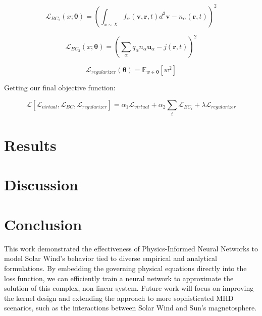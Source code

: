 \documentclass[12pt]{article}
\begin{document}
\begin{equation}
    \mathcal{L}_{BC_2} \left(x; \mathbf{\theta}\right) = \left(\int_{x \sim X} f_\alpha (\mathbf{v}, \mathbf{r}, t) d^3\mathbf{v} - n_\alpha(\mathbf{r}, t) \right)^2
\end{equation}

\begin{equation}
    \mathcal{L}_{BC_3} \left(x; \mathbf{\theta}\right) = \left(\sum_{\alpha} q_\alpha n_\alpha  \mathbf{u}_\alpha- j(\mathbf{r}, t) \right)^2
\end{equation}

\begin{equation}
    \mathcal{L}_{regularizer} \left( \mathbf{\theta} \right) = \mathbb{E}_{w \in \mathbf{\theta}}\left[ w ^ 2 \right]
\end{equation}

Getting our final objective function:

\begin{equation}
    \mathcal{L}\left[\mathcal{L}_{virtual}, \mathcal{L}_{BC}, \mathcal{L}_{regularizer}\right] = \alpha_1 \mathcal{L}_{virtual} + \alpha_2 \sum_{i} \mathcal{L}_{BC_i} + \lambda \mathcal{L}_{regularizer}
\end{equation}

\section{Results}

\section{Discussion}

\section{Conclusion}
This work demonstrated the effectiveness of Physics-Informed Neural Networks to model Solar Wind's behavior tied to diverse empirical and analytical formulations. By embedding the governing physical equations directly into the loss function, we can efficiently train a neural network to approximate the solution of this complex, non-linear system. Future work will focus on improving the kernel design and extending the approach to more sophisticated MHD scenarios, such as the interactions between Solar Wind and Sun's magnetosphere.




\end{document}

